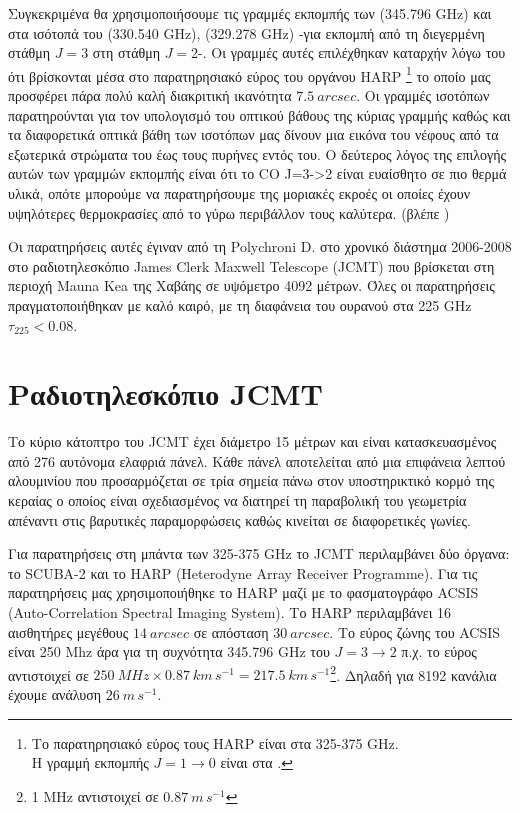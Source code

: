 \documentclass[a4paper,12pt]{memoir}
\begin{document}
Συγκεκριμένα θα χρησιμοποιήσουμε τις γραμμές εκπομπής των  (345.796 GHz) και στα ισότοπά του  (330.540 GHz),  (329.278 GHz) -για εκπομπή από τη διεγερμένη στάθμη $J=3$ στη στάθμη $J=2$-. Οι γραμμές αυτές επιλέχθηκαν καταρχήν λόγω του ότι βρίσκονται μέσα στο παρατηρησιακό εύρος του οργάνου HARP \footnote{Το παρατηρησιακό εύρος τους HARP είναι στα 325-375 GHz. \\ Η γραμμή εκπομπής  $J=1\to 0$ είναι στα .} το οποίο μας προσφέρει πάρα πολύ καλή διακριτική ικανότητα $7.5\ arcsec$. 
 Οι γραμμές ισοτόπων παρατηρούνται για τον υπολογισμό του οπτικού βάθους της κύριας γραμμής καθώς και τα διαφορετικά οπτικά βάθη των ισοτόπων μας δίνουν μια εικόνα του νέφους από τα εξωτερικά στρώματα του έως τους πυρήνες εντός του.
Ο δεύτερος λόγος της επιλογής αυτών των γραμμών εκπομπής είναι ότι το CO J=3->2 είναι ευαίσθητο σε πιο θερμά υλικά, οπότε μπορούμε να παρατηρήσουμε της μοριακές εκροές οι οποίες έχουν υψηλότερες θερμοκρασίες από το γύρω περιβάλλον τους καλύτερα. (βλέπε )

Οι παρατηρήσεις αυτές έγιναν από τη Polychroni D. στο χρονικό διάστημα 2006-2008 στο ραδιοτηλεσκόπιο James Clerk Maxwell Telescope (JCMT) που βρίσκεται στη περιοχή Mauna Kea της Χαβάης σε υψόμετρο 4092 μέτρων. Όλες οι παρατηρήσεις πραγματοποιήθηκαν με καλό καιρό, με τη διαφάνεια του ουρανού στα 225 GHz $\tau _{225} <0.08$.

\bigskip

\section{Ραδιοτηλεσκόπιο JCMT}

Το κύριο κάτοπτρο του JCMT έχει διάμετρο 15 μέτρων και είναι κατασκευασμένος από 276 αυτόνομα ελαφριά πάνελ. Κάθε πάνελ αποτελείται από μια επιφάνεια λεπτού αλουμινίου που προσαρμόζεται σε τρία σημεία πάνω στον υποστηρικτικό κορμό της κεραίας ο οποίος είναι σχεδιασμένος να διατηρεί τη παραβολική του γεωμετρία απέναντι στις βαρυτικές παραμορφώσεις καθώς κινείται σε διαφορετικές γωνίες.

Για παρατηρήσεις στη μπάντα των 325-375 GHz το JCMT περιλαμβάνει δύο όργανα: το SCUBA-2 και το HARP (Heterodyne Array Receiver Programme). Για τις παρατηρήσεις μας χρησιμοποιήθηκε το  HARP μαζί με το φασματογράφο ACSIS (Auto-Correlation Spectral Imaging System). Το HARP περιλαμβάνει 16 αισθητήρες μεγέθους $14 \ arcsec$ σε απόσταση $30 \ arcsec$. Το εύρος ζώνης του ACSIS είναι 250 Mhz άρα για τη συχνότητα 345.796 GHz του  $J=3\to 2$ π.χ. το εύρος αντιστοιχεί σε $250\ MHz \times 0.87\ km\,s^{-1} = 217.5\ km\,s^{-1}$\footnote{1 MHz αντιστοιχεί σε $0.87\  m\,s^{-1}$}. Δηλαδή για 8192 κανάλια έχουμε ανάλυση $26\ m\,s^{-1}$. 
\end{document}
